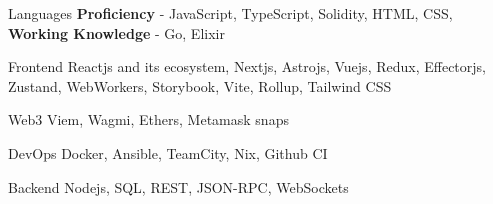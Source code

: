 

\begin{cvskills}

  \cvskill
    {Languages} %
    {\textbf{Proficiency} - JavaScript, TypeScript, Solidity, HTML, CSS, \textbf{Working Knowledge} - Go, Elixir} %

  \cvskill
    {Frontend} %
    {Reactjs and its ecosystem, Nextjs, Astrojs, Vuejs, Redux, Effectorjs, Zustand, WebWorkers, Storybook, Vite, Rollup, Tailwind CSS} %

  \cvskill
    {Web3} %
    {Viem, Wagmi, Ethers, Metamask snaps} %

  \cvskill
    {DevOps} %
    {Docker, Ansible, TeamCity, Nix, Github CI} %

  \cvskill
    {Backend} %
    {Nodejs, SQL, REST, JSON-RPC, WebSockets} %

\end{cvskills}
